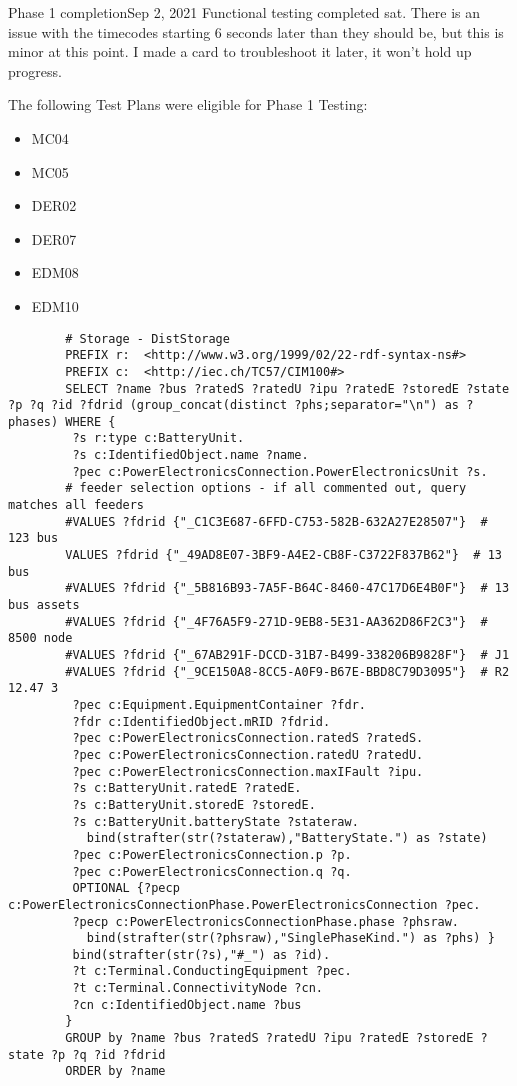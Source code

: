 \begin{entry}{Phase 1 completion}{Sep 2, 2021}
    Functional testing completed sat. There is an issue with the timecodes starting 6 seconds later than they should be,
    but this is minor at this point. I made a card to troubleshoot it later, it won't hold up progress.

    The following Test Plans were eligible for Phase 1 Testing:
    \begin{itemize}
        \item MC04
        \item MC05
        \item DER02
        \item DER07
        \item EDM08
        \item EDM10
    \end{itemize}


    \data
    
    \begin{verbatim}
        # Storage - DistStorage
        PREFIX r:  <http://www.w3.org/1999/02/22-rdf-syntax-ns#>
        PREFIX c:  <http://iec.ch/TC57/CIM100#>
        SELECT ?name ?bus ?ratedS ?ratedU ?ipu ?ratedE ?storedE ?state ?p ?q ?id ?fdrid (group_concat(distinct ?phs;separator="\n") as ?phases) WHERE {
         ?s r:type c:BatteryUnit.
         ?s c:IdentifiedObject.name ?name.
         ?pec c:PowerElectronicsConnection.PowerElectronicsUnit ?s.
        # feeder selection options - if all commented out, query matches all feeders
        #VALUES ?fdrid {"_C1C3E687-6FFD-C753-582B-632A27E28507"}  # 123 bus
        VALUES ?fdrid {"_49AD8E07-3BF9-A4E2-CB8F-C3722F837B62"}  # 13 bus
        #VALUES ?fdrid {"_5B816B93-7A5F-B64C-8460-47C17D6E4B0F"}  # 13 bus assets
        #VALUES ?fdrid {"_4F76A5F9-271D-9EB8-5E31-AA362D86F2C3"}  # 8500 node
        #VALUES ?fdrid {"_67AB291F-DCCD-31B7-B499-338206B9828F"}  # J1
        #VALUES ?fdrid {"_9CE150A8-8CC5-A0F9-B67E-BBD8C79D3095"}  # R2 12.47 3
         ?pec c:Equipment.EquipmentContainer ?fdr.
         ?fdr c:IdentifiedObject.mRID ?fdrid.
         ?pec c:PowerElectronicsConnection.ratedS ?ratedS.
         ?pec c:PowerElectronicsConnection.ratedU ?ratedU.
         ?pec c:PowerElectronicsConnection.maxIFault ?ipu.
         ?s c:BatteryUnit.ratedE ?ratedE.
         ?s c:BatteryUnit.storedE ?storedE.
         ?s c:BatteryUnit.batteryState ?stateraw.
           bind(strafter(str(?stateraw),"BatteryState.") as ?state)
         ?pec c:PowerElectronicsConnection.p ?p.
         ?pec c:PowerElectronicsConnection.q ?q.
         OPTIONAL {?pecp c:PowerElectronicsConnectionPhase.PowerElectronicsConnection ?pec.
         ?pecp c:PowerElectronicsConnectionPhase.phase ?phsraw.
           bind(strafter(str(?phsraw),"SinglePhaseKind.") as ?phs) }
         bind(strafter(str(?s),"#_") as ?id).
         ?t c:Terminal.ConductingEquipment ?pec.
         ?t c:Terminal.ConnectivityNode ?cn.
         ?cn c:IdentifiedObject.name ?bus
        }
        GROUP by ?name ?bus ?ratedS ?ratedU ?ipu ?ratedE ?storedE ?state ?p ?q ?id ?fdrid
        ORDER by ?name
    \end{verbatim}


\end{entry}
